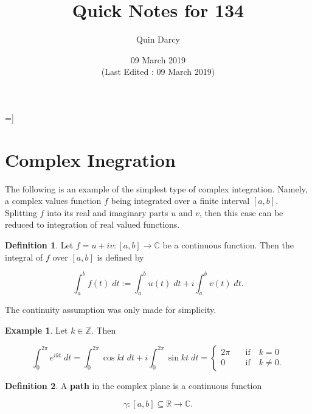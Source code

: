 =]\documentclass{article}
\theoremstyle{definition}
\newtheorem{definition}{Definition}[section]
\theoremstyle{remark}
\theoremstyle{definition}
\newtheorem{example}{Example}[section]
\begin{document}
\title{Quick Notes for 134}
\author{Quin Darcy}
\date{09 March 2019\\\small{(Last Edited : 09 March 2019)}}
\maketitle

\section{Complex Inegration}
 The following is an example of the simplest type of complex integration. Namely, a complex values function $f$ being integrated over a finite interval $[a,b]$. Splitting $f$ into its real and imaginary parts $u$ and $v$, then this case can be reduced to integration of real valued functions. 
 
\begin{definition}
    Let $f=u+iv\colon[a,b]\rightarrow\mathbb{C}$ be a continuous function. Then the integral of $f$ over $[a,b]$ is defined by
 
    \begin{equation*}
        \int_{a}^{b}f(t)\;dt:=\int_{a}^{b}u(t)\;dt+i\int_{a}^{b}v(t)\;dt.
    \end{equation*}
 
    \noindent The continuity assumption was only made for simplicity. 
\end{definition}
 
\begin{example}
    Let $k\in\mathbb{Z}$. Then 
    
    \begin{equation*}
        \int_{0}^{2\pi} e^{ikt}\;dt=\int_{0}^{2\pi}\cos{kt}\;dt+i\int_{0}^{2\pi}\sin{kt}\;dt=\begin{cases} 2\pi &\quad\text{if}\quad k=0 \\ 0 &\quad\text{if}\quad k\neq 0. \end{cases}
    \end{equation*}
\end{example}

\begin{definition}
    A \textbf{path} in the complex plane is a continuous function 
    
    \begin{equation*}
        \gamma\colon[a,b]\subseteq\mathbb{R}\rightarrow\mathbb{C}.
    \end{equation*}         
\end{definition}
\end{document}
